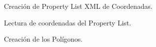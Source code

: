   \begin{figure}[h!]
 	\begin{center}
 		\caption{Creación de Property List XML de Coordenadas.}
 		\label{plist}
 	\end{center}
 \end{figure}
 \begin{figure}[h!]
	\begin{center}
		\caption{Lectura de coordenadas del Property List.}
		\label{edificioplist}
	\end{center}
\end{figure}
 \begin{figure}[h!]
	\begin{center}
		\caption{Creación de los Polígonos.}
		\label{poligono}
	\end{center}
\end{figure}
